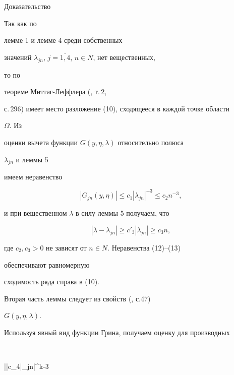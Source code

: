 \begin{pf*}%


{Доказательство{\normalshape{}}}


Так как по 


лемме 1 и лемме 4 среди собственных 


значений $\lambda_{jn}$, $j=\overline{1,4}$, $n\in N$, нет вещественных, 


то по 


теореме Миттаг-Леффлера (\cite{Mar}, т.\,2, 


с.\,296) имеет место разложение (10), сходящееся в каждой точке области 


$\Omega$. Из 


оценки вычета функции $G(y,\eta,\lambda)$ относительно полюса 


$\lambda_{jn}$ и леммы 5 


имеем неравенство 


\begin{equation} 


|G_{jn}(y,\eta)|\le c_1|\lambda_{jn}|^{-3}\le c_2n^{-3}, 


\end{equation} 


и при вещественном $\lambda$ в силу леммы 5 получаем, что 


\begin{equation} 


|\lambda-\lambda_{jn}|\ge c'_3|\lambda_{jn}|\ge c_3n, 


\end{equation} 


где $c_2,c_3>0$ не зависят от $n\in N$. Неравенства (12)--(13) 


обеспечивают равномерную 


сходимость ряда справа в (10). 


 


Вторая часть леммы следует из свойств (\cite{Nai}, с.47) 


$G(y,\eta,\lambda)$. \end{pf*} 


 


Используя явный вид функции Грина, получаем оценку для производных 


$$ 


\left|\right|\le c_4|\lambda_{jn}|^{k-3} 


